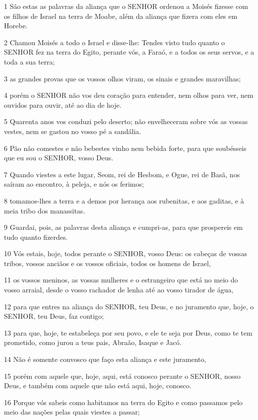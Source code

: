 \par 1 São estas as palavras da aliança que o SENHOR ordenou a Moisés fizesse com os filhos de Israel na terra de Moabe, além da aliança que fizera com eles em Horebe.
\par 2 Chamou Moisés a todo o Israel e disse-lhe: Tendes visto tudo quanto o SENHOR fez na terra do Egito, perante vós, a Faraó, e a todos os seus servos, e a toda a sua terra;
\par 3 as grandes provas que os vossos olhos viram, os sinais e grandes maravilhas;
\par 4 porém o SENHOR não vos deu coração para entender, nem olhos para ver, nem ouvidos para ouvir, até ao dia de hoje.
\par 5 Quarenta anos vos conduzi pelo deserto; não envelheceram sobre vós as vossas vestes, nem se gastou no vosso pé a sandália.
\par 6 Pão não comestes e não bebestes vinho nem bebida forte, para que soubésseis que eu sou o SENHOR, vosso Deus.
\par 7 Quando viestes a este lugar, Seom, rei de Hesbom, e Ogue, rei de Basã, nos saíram ao encontro, à peleja, e nós os ferimos;
\par 8 tomamos-lhes a terra e a demos por herança aos rubenitas, e aos gaditas, e à meia tribo dos manassitas.
\par 9 Guardai, pois, as palavras desta aliança e cumpri-as, para que prospereis em tudo quanto fizerdes.
\par 10 Vós estais, hoje, todos perante o SENHOR, vosso Deus: os cabeças de vossas tribos, vossos anciãos e os vossos oficiais, todos os homens de Israel,
\par 11 os vossos meninos, as vossas mulheres e o estrangeiro que está no meio do vosso arraial, desde o vosso rachador de lenha até ao vosso tirador de água,
\par 12 para que entres na aliança do SENHOR, teu Deus, e no juramento que, hoje, o SENHOR, teu Deus, faz contigo;
\par 13 para que, hoje, te estabeleça por seu povo, e ele te seja por Deus, como te tem prometido, como jurou a teus pais, Abraão, Isaque e Jacó.
\par 14 Não é somente convosco que faço esta aliança e este juramento,
\par 15 porém com aquele que, hoje, aqui, está conosco perante o SENHOR, nosso Deus, e também com aquele que não está aqui, hoje, conosco.
\par 16 Porque vós sabeis como habitamos na terra do Egito e como passamos pelo meio das nações pelas quais viestes a passar;

